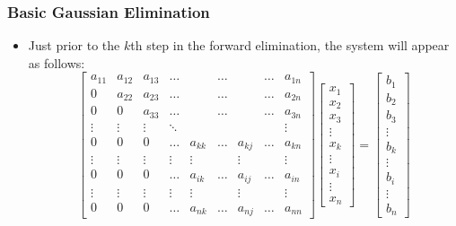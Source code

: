 \documentclass[notheorems,mathserif,table,compress]{beamer}  %
\begin{document}
\begin{frame}
\frametitle{Basic Gaussian Elimination}
\begin{itemize}
\item  Just prior to the $k$th step in the forward elimination, the system will appear as follows:
\begin{displaymath}
\begin{bmatrix}
a_{11} & a_{12} & a_{13} & \ldots &     & \ldots  & & \ldots & a_{1n}\\
0      & a_{22} & a_{23} & \ldots &     & \ldots  & & \ldots & a_{2n}\\
0      & 0      & a_{33} & \ldots &     & \ldots  & & \ldots & a_{3n}\\
\vdots & \vdots & \vdots & \ddots &     &         & &        &\vdots \\
0      & 0      & 0      & \ldots &a_{kk}& \ldots & a_{kj} & \ldots & a_{kn}\\
\vdots & \vdots & \vdots & \vdots &\vdots&        & \vdots &        &\vdots \\
0      & 0      & 0      & \ldots & a_{ik}&\ldots & a_{ij} & \ldots & a_{in}\\
\vdots & \vdots & \vdots & \vdots &\vdots&        & \vdots &        &\vdots \\
0      & 0      & 0      & \ldots & a_{nk}&\ldots & a_{nj} & \ldots & a_{nn}
\end{bmatrix}
\begin{bmatrix}
x_1\\
x_2\\
x_3\\
\vdots\\
x_k\\
\vdots\\
x_i\\
\vdots\\
x_n
\end{bmatrix}
=\begin{bmatrix}
b_1\\
b_2\\
b_3\\
\vdots\\
b_k\\
\vdots\\
b_i\\
\vdots\\
b_n
\end{bmatrix}
\end{displaymath}

\end{itemize}
\end{frame}
\end{document}
